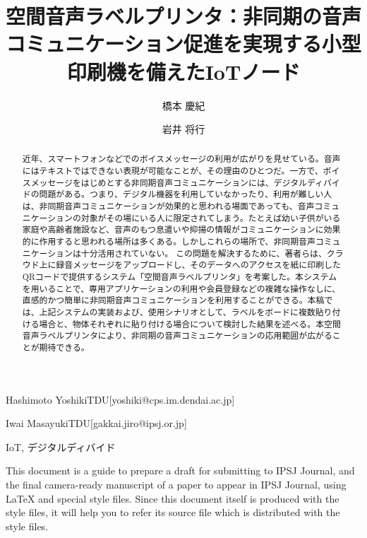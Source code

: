 \documentclass[submit]{ipsj}
\begin{document}
\title{空間音声ラベルプリンタ：非同期の音声コミュニケーション促進を実現する小型印刷機を備えたIoTノード}





\author{橋本 慶紀}{Hashimoto Yoshiki}{TDU}[yoshiki@cps.im.dendai.ac.jp]
\author{岩井 将行}{Iwai Masayuki}{TDU}[gakkai.jiro@ipsj.or.jp]


\begin{abstract}
近年、スマートフォンなどでのボイスメッセージの利用が広がりを見せている。音声にはテキストではできない表現が可能なことが、その理由のひとつだ。一方で、ボイスメッセージをはじめとする非同期音声コミュニケーションには、デジタルディバイドの問題がある。つまり、デジタル機器を利用していなかったり、利用が難しい人は、非同期音声コミュニケーションが効果的と思われる場面であっても、音声コミュニケーションの対象がその場にいる人に限定されてしまう。たとえば幼い子供がいる家庭や高齢者施設など、音声のもつ息遣いや抑揚の情報がコミュニケーションに効果的に作用すると思われる場所は多くある。しかしこれらの場所で、非同期音声コミュニケーションは十分活用されていない。
この問題を解決するために、著者らは、クラウド上に録音メッセージをアップロードし、そのデータへのアクセスを紙に印刷したQRコードで提供するシステム「空間音声ラベルプリンタ」を考案した。本システムを用いることで、専用アプリケーションの利用や会員登録などの複雑な操作なしに、直感的かつ簡単に非同期音声コミュニケーションを利用することができる。本稿では、上記システムの実装および、使用シナリオとして、ラベルをボードに複数貼り付ける場合と、物体それぞれに貼り付ける場合について検討した結果を述べる。本空間音声ラベルプリンタにより、非同期の音声コミュニケーションの応用範囲が広がることが期待できる。
\end{abstract}


\begin{jkeyword}
IoT, デジタルディバイド
\end{jkeyword}

\begin{eabstract}
This document is a guide to prepare a draft for submitting to IPSJ
Journal, and the final camera-ready manuscript of a paper to appear in
IPSJ Journal, using {\LaTeX} and special style files.  Since this
document itself is produced with the style files, it will help you to
refer its source file which is distributed with the style files.
\end{eabstract}
\end{document}
